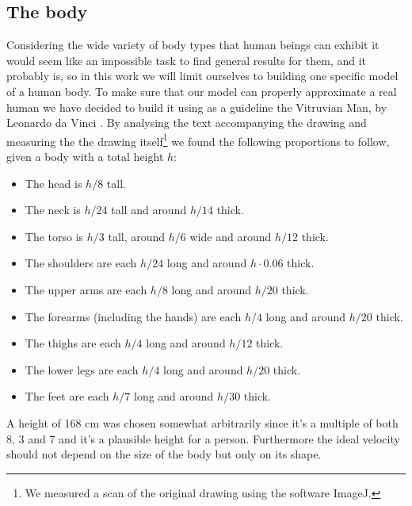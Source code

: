 \documentclass[a4paper,12pt]{article}
\begin{document}
\subsection{The body}
Considering the wide variety of body types that human beings can exhibit it would seem like an impossible task to find general results for them, and it probably is, so in this work we will limit ourselves to building one specific model of a human body. To make sure that our model can properly approximate a real human we have decided to build it using as a guideline the Vitruvian Man, by Leonardo da Vinci \cite{DaVinci}. By analysing the text accompanying the drawing and measuring the the drawing itself\footnote{We measured a scan of the original drawing using the software ImageJ.} we found the following proportions to follow, given a body with a total height $h$:
\begin{itemize}
  \item The head is $h/8$ tall.
  \item The neck is $h/24$ tall and around $h/14$ thick.
  \item The torso is $h/3$ tall, around $h/6$ wide and around $h/12$ thick.
  \item The shoulders are each $h/24$ long and around $h\cdot 0.06$ thick.
  \item The upper arms are each $h/8$ long and around $h/20$ thick.
  \item The forearms (including the hands) are each $h/4$ long and around $h/20$ thick.
  \item The thighs are each $h/4$ long and around $h/12$ thick.
  \item The lower legs are each $h/4$ long and around $h/20$ thick.
  \item The feet are each $h/7$ long and around $h/30$ thick.
\end{itemize}
A height of 168 cm was chosen somewhat arbitrarily since it's a multiple of both 8, 3 and 7 and it's a plausible height for a person. Furthermore the ideal velocity should not depend on the size of the body but only on its shape.
\end{document}
